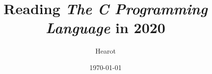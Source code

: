 
\title{Reading \textit{The C Programming Language} in 2020}
\author{Hearot}
\date{\today}
\maketitle
